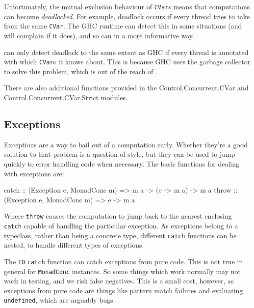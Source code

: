 Unfortunately, the mutual exclusion behaviour of \verb|CVar|s means
that computations can become \emph{deadlocked}. For example, deadlock
occurs if every thread tries to take from the same \verb|CVar|. The
GHC runtime can detect this in some situations (and will complain if
it does), and so can \dejafu{} in a more informative way.

\begin{departure}
  \dejafu{} can only detect deadlock to the same extent as GHC if
  every thread is annotated with which \verb|CVar|s it knows
  about. This is because GHC uses the garbage collector to solve this
  problem, which is out of the reach of \dejafu{}.
\end{departure}

There are also additional functions provided in the
Control\-.Concurrent\-.CVar and Control\-.Concurrent\-.CVar\-.Strict
modules.

\subsection{Exceptions}
\label{sec:abstraction-typeclass-excs}

Exceptions are a way to bail out of a computation early. Whether
they're a good solution to that problem is a question of style, but
they can be used to jump quickly to error handling code when
necessary. The basic functions for dealing with exceptions are:

\begin{haskellcode}
catch :: (Exception e, MonadConc m) => m a -> (e -> m a) -> m a
throw :: (Exception e, MonadConc m) => e -> m a
\end{haskellcode}

Where \verb|throw| causes the computation to jump back to the nearest
enclosing \verb|catch| capable of handling the particular
exception. As exceptions belong to a typeclass, rather than being a
concrete type, different \verb|catch| functions can be nested, to
handle different types of exceptions.

\begin{departure}
  The \verb|IO| \verb|catch| function can catch exceptions from pure
  code. This is not true in general for \verb|MonadConc| instances.
  So some things which work normally may not work in testing, and we
  risk false negatives. This is a small cost, however, as exceptions
  from pure code are things like pattern match failures and evaluating
  \verb|undefined|, which are arguably bugs.
\end{departure}

